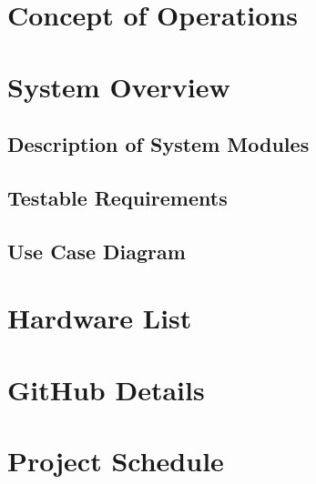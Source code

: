 




\usepackage[compact]{titlesec}





\section{Concept of Operations}

\section{System Overview}
\subsection{Description of System Modules}
\subsection{Testable Requirements}
\subsection{Use Case Diagram}

\section{Hardware List}

\section{GitHub Details}

\section{Project Schedule}


